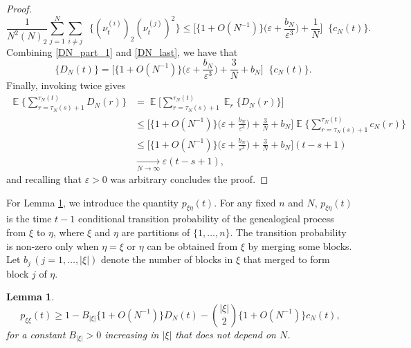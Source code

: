 \documentclass{article}
\newtheorem{lemma}{Lemma}
\theoremstyle{definition}
\DeclareMathOperator{\E}{\mathbb{E}}
\DeclareMathOperator{\Et}{\mathbb{E}_t}
\newcommand{\1}[1]{\mathbbm{1}_{\{#1\}}}
\begin{document}
\begin{proof}
\begin{equation}
\frac{ 1 }{ N^2 ( N )_2 } \sum_{ j=1 }^N \sum_{ i \neq j } \Et\{ ( \nu_t^{(i)} )_2 ( \nu_t^{(j)} )^2 \} \leq \Bigg[ \{ 1 + O( N^{ -1 } ) \} \Big( \varepsilon + \frac{ b_N }{ \varepsilon^3 } \Big) + \frac{ 1 }{ N } \Bigg] \Et\{ c_N( t ) \}. \label{DN_last}
\end{equation}
Combining \eqref{DN_part_1} and \eqref{DN_last}, we have that
\begin{equation*}
\Et\{D_N(t)\} = \Bigg[ \{ 1 + O( N^{ -1 } ) \} \Bigg( \varepsilon + \frac{ b_N }{ \varepsilon^3 } \Bigg) + \frac{ 3 }{ N } + b_N \Bigg] \Et\{c_N(t)\}.
\end{equation*}
Finally, invoking \citet[Lemma 2]{koskela2018} twice gives
\begin{align*}
\E\Bigg\{ \sum_{ r = \tau_N( s ) + 1 }^{ \tau_N( t ) } D_N( r ) \Bigg\} &= \E\Bigg[ \sum_{ r = \tau_N( s ) + 1 }^{ \tau_N( t ) } \E_r\{ D_N( r ) \} \Bigg] \\
&\leq \Bigg[ \{ 1 + O( N^{ -1 } ) \} \Bigg( \varepsilon + \frac{ b_N }{ \varepsilon^3 } \Bigg) + \frac{ 3 }{ N } + b_N \Bigg] \E\Bigg\{ \sum_{ r = \tau_N( s ) + 1 }^{ \tau_N( t ) } c_N( r ) \Bigg\} \\
&\leq \Bigg[ \{ 1 + O( N^{ -1 } ) \} \Bigg( \varepsilon + \frac{ b_N }{ \varepsilon^3 } \Bigg) + \frac{ 3 }{ N } + b_N \Bigg] ( t - s + 1 )\\
& \underset{N\to\infty}{\longrightarrow} \varepsilon ( t - s + 1 ),
\end{align*}
and recalling that $\varepsilon > 0$ was arbitrary concludes the proof.
\end{proof}

For Lemma \ref{lem:removeass4}, we introduce the quantity $p_{\xi\eta}(t)$. For any fixed $n$ and $N$, $p_{\xi\eta}(t)$ is the time $t-1$ conditional transition probability of the genealogical process from $\xi$ to $\eta$, where $\xi$ and $\eta$ are partitions of $\{1,\dots,n\}$. The transition probability is non-zero only when $\eta =\xi$ or $\eta$ can be obtained from $\xi$ by merging some blocks.
Let $b_j\, (j=1,\dots,|\xi|)$ denote the number of blocks in $\xi$ that merged to form block $j$ of $\eta$.

\begin{lemma}\label{lem:removeass4}
\begin{equation}\label{eq:removeass4}
p_{ \xi \xi }( t ) \geq 1 - B_{ | \xi |  } \{ 1 + O( N^{ -1 } ) \} D_N( t ) -  \binom{ | \xi | }{ 2 } \{ 1 + O( N^{-1} ) \} c_N( t ) ,
\end{equation}
for a constant $B_{ | \xi |  } > 0$ increasing in $|\xi|$ that does not depend on $N$.
\end{lemma}
\end{document}
